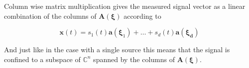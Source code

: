 \documentclass[11pt]{article}
\newcommand{\vct}[1]{\boldsymbol{#1}}
\begin{document}
Column wise matrix multiplication gives the measured signal vector as a linear combination of the columns of $\vct{A}(\vct{\xi})$ according to

\begin{equation} \label{eq:5}
\vct{x}(t) = s_1(t)\vct{a}(\vct{\xi}_1) + \dots + s_d(t)\vct{a}(\vct{\xi_d})
\end{equation}

And just like in the case with a single source this means that the signal is confined to a subspace of $\mathbb C^n$ spanned by the columns of $\vct{A}(\vct{\xi})$.








\end{document}
